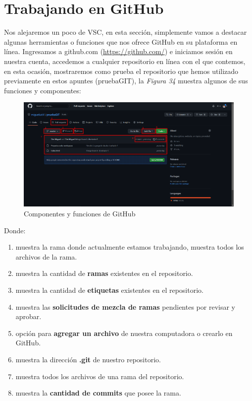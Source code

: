 \section{Trabajando en GitHub}
\hspace{0.55cm}Nos alejaremos un poco de VSC, en esta sección, simplemente vamos a destacar algunas herramientas o funciones que nos ofrece GitHub en su plataforma en línea. Ingresamos a github.com (\underline{https://github.com/}) e iniciamos sesión en nuestra cuenta, accedemos a cualquier repositorio en línea con el que contemos, en esta ocasión, mostraremos como prueba el repositorio que hemos utilizado previamente en estos apuntes (pruebaGIT), la \textit{Figura 34} muestra algunos de sus funciones y componentes:
\begin{figure}[H]
    \begin{center}
        \caption{Componentes y funciones de GitHub}
        \label{fig: 34}
        \includegraphics[width=14cm]{capturas/github.png}
    \end{center}
\end{figure}

Donde:
\begin{enumerate}
    \item muestra la rama donde actualmente estamos trabajando, muestra todos los archivos de la rama.
    \item muestra la cantidad de \textbf{ramas} existentes en el repositorio.
    \item muestra la cantidad de \textbf{etiquetas} existentes en el repositorio.
    \item muestra las \textbf{solicitudes de mezcla de ramas} pendientes por revisar y aprobar.
    \item opción para \textbf{agregar un archivo} de nuestra computadora o crearlo en GitHub.
    \item muestra la dirección \textbf{.git} de nuestro repositorio.
    \item muestra todos los archivos de una rama del repositorio.
    \item muestra la \textbf{cantidad de commits} que posee la rama.
\end{enumerate}





